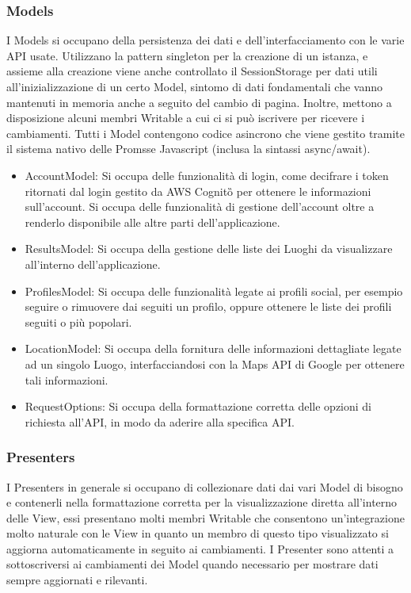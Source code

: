     \subsubsection{Models}
        I Models si occupano della persistenza dei dati e dell'interfacciamento con le varie API usate. Utilizzano la pattern singleton per la creazione di un istanza, e assieme alla creazione viene anche controllato il SessionStorage 
        per dati utili all'inizializzazione di un certo Model, sintomo di dati fondamentali che vanno mantenuti in memoria anche a seguito del cambio di pagina. Inoltre, mettono a disposizione alcuni membri Writable a cui ci si può iscrivere per ricevere i cambiamenti.
        Tutti i Model contengono codice asincrono che viene gestito tramite il sistema nativo delle Promsse Javascript (inclusa la sintassi async/await).
        \begin{itemize}
            \item AccountModel: Si occupa delle funzionalità di login, come decifrare i token ritornati dal login gestito da AWS Cognito\G{} per ottenere le informazioni sull'account. Si occupa delle funzionalità di gestione dell'account oltre a renderlo disponibile alle altre parti dell'applicazione.
            \item ResultsModel: Si occupa della gestione delle liste dei Luoghi da visualizzare all'interno dell'applicazione.
            \item ProfilesModel: Si occupa delle funzionalità legate ai profili social, per esempio seguire o rimuovere dai seguiti un profilo, oppure ottenere le liste dei profili seguiti o più popolari.
            \item LocationModel: Si occupa della fornitura delle informazioni dettagliate legate ad un singolo Luogo, interfacciandosi con la Maps API di Google per ottenere tali informazioni.
            \item RequestOptions: Si occupa della formattazione corretta delle opzioni di richiesta all'API, in modo da aderire alla specifica API.
        \end{itemize}
    \subsubsection{Presenters}
        I Presenters in generale si occupano di collezionare dati dai vari Model di bisogno e contenerli nella formattazione corretta per la visualizzazione diretta all'interno delle View, essi presentano molti membri Writable che consentono
        un'integrazione molto naturale con le View in quanto un membro di questo tipo visualizzato si aggiorna automaticamente in seguito ai cambiamenti. I Presenter sono attenti a sottoscriversi ai cambiamenti dei Model quando necessario per mostrare dati sempre aggiornati e rilevanti.
